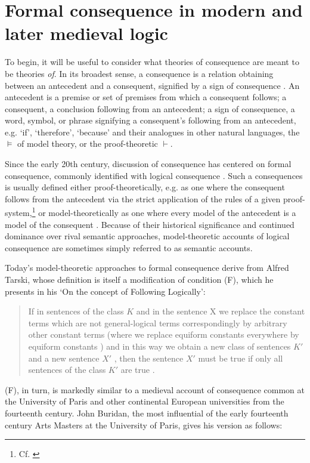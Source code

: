 \documentclass[a4paper, 11pt]{article}
\begin{document}
\section{Formal consequence in modern and later medieval logic}
To begin, it will be useful to consider what theories of consequence are meant to be theories \emph{of}. In its broadest sense, a consequence is a relation obtaining between an antecedent and a consequent, signified by a sign of consequence \autocite{StrodeConsequentiis,Green-Pedersen1980a}. An antecedent is a premise or set of premises from which a consequent follows; a consequent, a conclusion following from an antecedent; a sign of consequence, a word, symbol, or phrase signifying a consequent's following from an antecedent, e.g.  `if', `therefore', `because' and their analogues in other natural languages, the $\vDash$ of model theory, or the proof-theoretic $\vdash$. 

Since the early 20th century, discussion of consequence has centered on formal consequence, commonly identified with logical consequence \autocite{Tarski2002,Gomez-Torrente2000}. Such a consequences is usually defined either proof-theoretically, e.g. as one where the consequent follows from the antecedent via the strict application of the rules of a given proof-system,\footnote{Cf. \autocite{Prawitz1985,Schroeder-Heister2006,Hjortland2009,Franks2010}} or model-theoretically as one where every model of the antecedent is a model of the consequent \autocite{Tarski2002}. Because of their historical significance and continued dominance over rival semantic approaches, model-theoretic accounts of logical consequence are sometimes simply referred to as semantic accounts.

Today's model-theoretic approaches to formal consequence derive from Alfred Tarski, whose definition is itself a modification of condition (F), which he presents in his `On the concept of Following Logically':

\begin{quote}
  If in sentences of the class $K$ and in the sentence X we replace the constant terms which are not general-logical terms correspondingly by arbitrary other constant terms (where we replace equiform constants everywhere by equiform constants ) and in this way we obtain a new class of sentences $K'$ and a new sentence $X'$ , then the sentence $X'$ must be true if only all sentences of the class $K'$ are true \autocite[183-184]{Tarski2002}.
\end{quote} 
(F), in turn, is markedly similar to a medieval account of consequence common at the University of Paris and other continental European universities from the fourteenth century. John Buridan, the most influential of the early fourteenth century Arts Masters at the University of Paris, gives his version as follows: 
\end{document}
